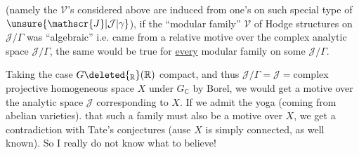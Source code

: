 (namely the $\mathscr{V}$'s considered above are induced from one's on such special type of $\unsure{\mathscr{J}|\mathcal{J}|\gamma}$), if the ``modular family'' $\mathscr{V}$ of Hodge structures on  $\mathscr{J}/\Gamma$ was ``algebraic'' i.e. came from a relative motive over the complex analytic space $\mathscr{J}/\Gamma$,  the same would be true for \uline{every} modular family on some $\mathscr{J}/\Gamma$.

Taking the case $G\deleted{_{\mathbb{R}}}(\mathbb{R})$ compact,  and thus $\mathscr{J}/\Gamma=\mathscr{J}={}$complex projective homogeneous space $X$ under $G_{\mathbb{C}}$ by Borel, we would get a  motive over the analytic space $\mathscr{J}$ corresponding to $X$. If we admit the  yoga (coming from  abelian varieties). that such a family must also be a motive over $X$,  we  get a contradiction with Tate's conjectures  (ause $X$ is simply connected, as well known). So I really do not know what to believe!
